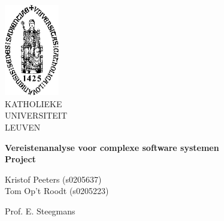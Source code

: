 \thispagestyle{empty}
\begin{flushleft}
\includegraphics[height=40mm]{figs/sedes_2.jpg}\\
\small
KATHOLIEKE\\ UNIVERSITEIT\\ LEUVEN
\end{flushleft}


\begin{center}
\LARGE
\textbf{Vereistenanalyse voor complexe software systemen} \\
\textbf{Project}
\end{center}


\begin{flushleft}
\small
Kristof Peeters (s0205637) \\
Tom Op't Roodt (s0205223)
\end{flushleft}

\begin{flushleft}
Prof. E. Steegmans
\end{flushleft}
